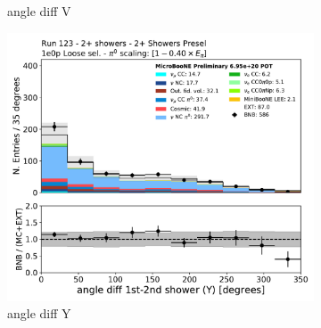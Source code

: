 \begin{figure}[H]
\begin{subfigure}{0.3\textwidth}
    \caption{angle diff V}
    \end{subfigure}
    \begin{subfigure}{0.3\textwidth}
    \includegraphics[width=1.0\textwidth]{Sidebands/Figures/TwoShr_1e0pSel/loose/anglediff_Y.pdf}
    \caption{angle diff Y}
    \end{subfigure}
    \caption{} 
    \label{fig:HE_1eNp_1}
\end{figure}

